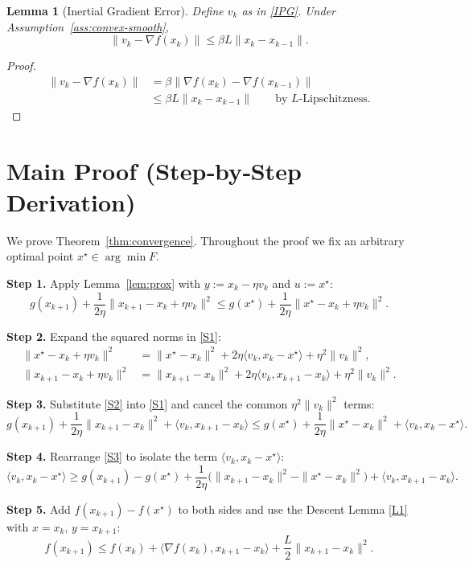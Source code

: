 \documentclass{article}
\newtheorem{lemma}{Lemma}
\begin{document}
\begin{lemma}[Inertial Gradient Error]\label{lem:inertial-error}
Define $v_k$ as in \eqref{IPG}. Under Assumption~\ref{ass:convex-smooth},
\[
\|v_k-\nabla f(x_k)\|\le \beta L\|x_k-x_{k-1}\|.
\tag{L3}
\]
\end{lemma}
\begin{proof}
\[
\begin{aligned}
\|v_k-\nabla f(x_k)\|
&=\beta\|\nabla f(x_k)-\nabla f(x_{k-1})\|\\
&\le\beta L\|x_k-x_{k-1}\|\qquad\text{by $L$‑Lipschitzness.}
\end{aligned}
\]
\end{proof}

\newpage
\section*{Main Proof (Step‑by‑Step Derivation)}
We prove Theorem~\ref{thm:convergence}. Throughout the proof we fix an arbitrary optimal point $x^{\star}\in\arg\min F$.

\noindent\textbf{Step 1.} Apply Lemma~\ref{lem:prox} with $y:=x_k-\eta v_k$ and $u:=x^{\star}$:
\[
g(x_{k+1})+\frac{1}{2\eta}\|x_{k+1}-x_k+\eta v_k\|^{2}
\le g(x^{\star})+\frac{1}{2\eta}\|x^{\star}-x_k+\eta v_k\|^{2}.
\tag{S1}
\]

\noindent\textbf{Step 2.} Expand the squared norms in \eqref{S1}:
\[
\begin{aligned}
\|x^{\star}-x_k+\eta v_k\|^{2}
&=\|x^{\star}-x_k\|^{2}+2\eta\langle v_k,x_k-x^{\star}\rangle+\eta^{2}\|v_k\|^{2},\\
\|x_{k+1}-x_k+\eta v_k\|^{2}
&=\|x_{k+1}-x_k\|^{2}+2\eta\langle v_k,x_{k+1}-x_k\rangle+\eta^{2}\|v_k\|^{2}.
\end{aligned}
\tag{S2}
\]

\noindent\textbf{Step 3.} Substitute \eqref{S2} into \eqref{S1} and cancel the common $\eta^{2}\|v_k\|^{2}$ terms:
\[
g(x_{k+1})+ \frac{1}{2\eta}\|x_{k+1}-x_k\|^{2}
+ \langle v_k, x_{k+1}-x_k\rangle
\le g(x^{\star})+ \frac{1}{2\eta}\|x^{\star}-x_k\|^{2}
+ \langle v_k, x_k-x^{\star}\rangle .
\tag{S3}
\]

\noindent\textbf{Step 4.} Rearrange \eqref{S3} to isolate the term $\langle v_k, x_k-x^{\star}\rangle$:
\[
\langle v_k, x_k-x^{\star}\rangle
\ge g(x_{k+1})-g(x^{\star})
+\frac{1}{2\eta}\bigl(\|x_{k+1}-x_k\|^{2}
-\|x^{\star}-x_k\|^{2}\bigr)
+ \langle v_k, x_{k+1}-x_k\rangle .
\tag{S4}
\]

\noindent\textbf{Step 5.} Add $f(x_{k+1})-f(x^{\star})$ to both sides and use the Descent Lemma \eqref{L1} with $x=x_k$, $y=x_{k+1}$:
\[
f(x_{k+1})\le f(x_k)+\langle\nabla f(x_k),x_{k+1}-x_k\rangle
+\frac{L}{2}\|x_{k+1}-x_k\|^{2}.
\tag{S5}
\]
\end{document}
